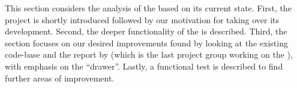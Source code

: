 This section considers the analysis of the \launcher based on its current state.
First, the \launcher project is shortly introduced followed by our motivation for taking over its development.
Second, the deeper functionality of the \launcher is described.
Third, the section focuses on our desired improvements found by looking at the existing code-base and the report by \citet{launcher2012} (which is the last project group working on the \launcher), with emphasis on the ``drawer''.
Lastly, a functional test is described to find further areas of improvement.